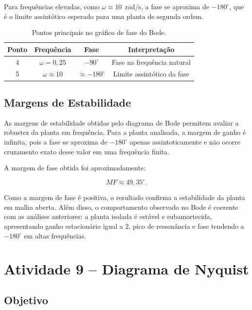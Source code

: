 \documentclass[12pt,a4paper]{article}
\begin{document}
Para frequências elevadas, como $\omega\approx10$~rad/s, a fase se aproxima de $-180^\circ$, que é o limite assintótico esperado para uma planta de segunda ordem.

\begin{table}[H]
  \centering
  \caption{Pontos principais no gráfico de fase do Bode.}
  \label{tab:q8_fase}
  \begin{tabular}{cccc}
    \toprule
    \textbf{Ponto} & \textbf{Frequência} & \textbf{Fase} & \textbf{Interpretação} \\
    \midrule
    4 & $\omega=0{,}25$ & $-90^\circ$ & Fase na frequência natural \\
    5 & $\omega\approx10$ & $\approx-180^\circ$ & Limite assintótico da fase \\
    \bottomrule
  \end{tabular}
\end{table}

\subsection{Margens de Estabilidade}

As margens de estabilidade obtidas pelo diagrama de Bode permitem avaliar a robustez da planta em frequência. Para a planta analisada, a margem de ganho é infinita, pois a fase se aproxima de $-180^\circ$ apenas assintoticamente e não ocorre cruzamento exato desse valor em uma frequência finita.

A margem de fase obtida foi aproximadamente:

\begin{equation}
  MF\approx49{,}35^\circ.
\end{equation}

Como a margem de fase é positiva, o resultado confirma a estabilidade da planta em malha aberta. Além disso, o comportamento observado no Bode é coerente com as análises anteriores: a planta isolada é estável e subamortecida, apresentando ganho estacionário igual a $2$, pico de ressonância e fase tendendo a $-180^\circ$ em altas frequências.


\section{Atividade 9 -- Diagrama de Nyquist}

\subsection{Objetivo}
\end{document}
